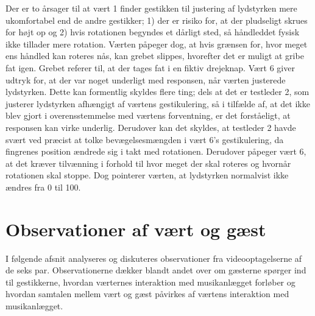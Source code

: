Der er to årsager til at vært 1 finder gestikken til justering af lydstyrken mere ukomfortabel end de andre gestikker; 1) der er risiko for, at der pludseligt skrues for højt op og 2) hvis rotationen begyndes et dårligt sted, så håndleddet fysisk ikke tillader mere rotation. Værten påpeger dog, at hvis grænsen for, hvor meget ens håndled kan roteres nås, kan grebet slippes, hvorefter det er muligt at gribe fat igen. Grebet referer til, at der tages fat i en fiktiv drejeknap. Vært 6 giver udtryk for, at der var noget underligt med responsen, når værten justerede lydstyrken. Dette kan formentlig skyldes flere ting; dels at det er testleder 2, som justerer lydstyrken afhængigt af værtens gestikulering, så i tilfælde af, at det ikke blev gjort i overensstemmelse med værtens forventning, er det forståeligt, at responsen kan virke underlig. Derudover kan det skyldes, at testleder 2 havde svært ved præcist at tolke bevægelsesmængden i vært 6's gestikulering, da fingrenes position ændrede sig i takt med rotationen. Derudover påpeger vært 6, at det kræver tilvænning i forhold til hvor meget der skal roteres og hvornår rotationen skal stoppe. Dog pointerer værten, at lydstyrken normalvist ikke ændres fra 0 til 100. 
%
\section{Observationer af vært og gæst}
\label{TestresultaterSocialAcceptGestikkerObservationer}
%
I følgende afsnit analyseres og diskuteres observationer fra videooptagelserne af de seks par. Observationerne dækker blandt andet over om gæsterne spørger ind til gestikkerne, hvordan værternes interaktion med musikanlægget forløber og hvordan samtalen mellem vært og gæst påvirkes af værtens interaktion med musikanlægget.
%
